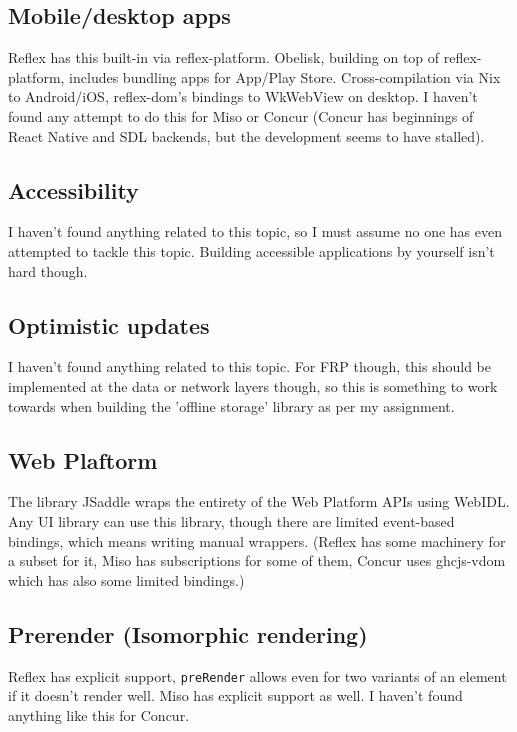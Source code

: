 \documentclass[english,odsaz]{fitthesis}
\begin{document}
\subsection{Mobile/desktop apps}
\label{sec:org7953a3b}
Reflex has this built-in via reflex-platform. Obelisk, building on top of
reflex-platform, includes bundling apps for App/Play Store. Cross-compilation via
Nix to Android/iOS, reflex-dom's bindings to WkWebView on desktop. I haven't
found any attempt to do this for Miso or Concur (Concur has beginnings of React
Native and SDL backends, but the development seems to have stalled).

\subsection{Accessibility}
\label{sec:orgfd3d99d}
I haven't found anything related to this topic, so I must assume no one has even
attempted to tackle this topic. Building accessible applications by yourself
isn't hard though.

\subsection{Optimistic updates}
\label{sec:org3cde453}
I haven't found anything related to this topic. For FRP though, this should be
implemented at the data or network layers though, so this is something to work
towards when building the 'offline storage' library as per my assignment.

\subsection{Web Plaftorm}
\label{sec:org472434a}
The library JSaddle wraps the entirety of the Web Platform APIs using
WebIDL. Any UI library can use this library, though there are limited
event-based bindings, which means writing manual wrappers. (Reflex has some
machinery for a subset for it, Miso has subscriptions for some of them, Concur
uses ghcjs-vdom which has also some limited bindings.)

\subsection{Prerender (Isomorphic rendering)}
\label{sec:org9bd88aa}
Reflex has explicit support, \texttt{preRender} allows even for two variants of an
element if it doesn't render well. Miso has explicit support as well. I haven't
found anything like this for Concur.
\end{document}
